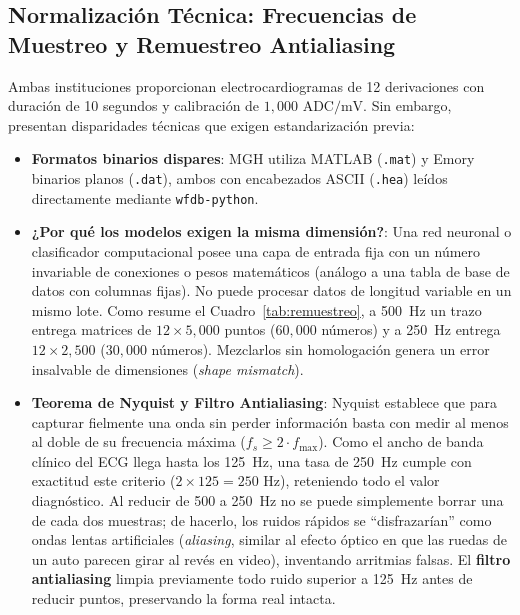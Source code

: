 \documentclass[11pt,a4paper]{article}
\begin{document}
\subsection{Normalización Técnica: Frecuencias de Muestreo y Remuestreo Antialiasing}
Ambas instituciones proporcionan electrocardiogramas de 12 derivaciones con duración de 10 segundos y calibración de $1{,}000\text{ ADC/mV}$. Sin embargo, presentan disparidades técnicas que exigen estandarización previa:
\begin{itemize}[topsep=1pt, itemsep=1pt, parsep=0pt]
    \item \textbf{Formatos binarios dispares}: MGH utiliza MATLAB (\texttt{.mat}) y Emory binarios planos (\texttt{.dat}), ambos con encabezados ASCII (\texttt{.hea}) leídos directamente mediante \texttt{wfdb-python}.
    \item \textbf{¿Por qué los modelos exigen la misma dimensión?}: Una red neuronal o clasificador computacional posee una capa de entrada fija con un número invariable de conexiones o pesos matemáticos (análogo a una tabla de base de datos con columnas fijas). No puede procesar datos de longitud variable en un mismo lote. Como resume el Cuadro~\ref{tab:remuestreo}, a 500~Hz un trazo entrega matrices de $12 \times 5{,}000$ puntos ($60{,}000$ números) y a 250~Hz entrega $12 \times 2{,}500$ ($30{,}000$ números). Mezclarlos sin homologación genera un error insalvable de dimensiones (\textit{shape mismatch}).
    \item \textbf{Teorema de Nyquist y Filtro Antialiasing}: Nyquist establece que para capturar fielmente una onda sin perder información basta con medir al menos al doble de su frecuencia máxima ($f_s \ge 2 \cdot f_{\max}$). Como el ancho de banda clínico del ECG llega hasta los 125~Hz, una tasa de 250~Hz cumple con exactitud este criterio ($2 \times 125 = 250\text{ Hz}$), reteniendo todo el valor diagnóstico. Al reducir de 500 a 250~Hz no se puede simplemente borrar una de cada dos muestras; de hacerlo, los ruidos rápidos se ``disfrazarían'' como ondas lentas artificiales (\textit{aliasing}, similar al efecto óptico en que las ruedas de un auto parecen girar al revés en video), inventando arritmias falsas. El \textbf{filtro antialiasing} limpia previamente todo ruido superior a 125~Hz antes de reducir puntos, preservando la forma real intacta.
\end{itemize}
\end{document}
